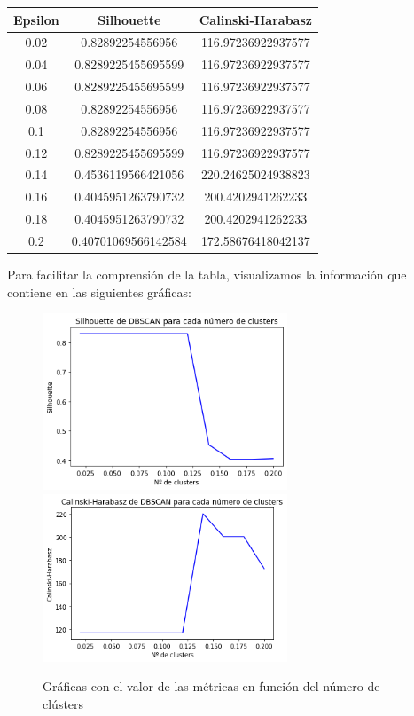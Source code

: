 \documentclass[a4]{article}
\begin{document}
\begin{center}
\begin{tabular}{|c|c|c|}
\hline
\multicolumn{1}{|c|}{\textbf{Epsilon}}& \textbf{Silhouette} & \textbf{Calinski-Harabasz}\\ \hline
  0.02  & 0.82892254556956    & 116.97236922937577  \\ \hline
  0.04  & 0.8289225455695599  & 116.97236922937577  \\ \hline
  0.06  & 0.8289225455695599  & 116.97236922937577  \\ \hline
  0.08  & 0.82892254556956    & 116.97236922937577  \\ \hline
  0.1   & 0.82892254556956    & 116.97236922937577  \\ \hline
  0.12  & 0.8289225455695599  & 116.97236922937577  \\ \hline
  0.14  & 0.4536119566421056  & 220.24625024938823  \\ \hline
  0.16  & 0.4045951263790732  & 200.4202941262233   \\ \hline
  0.18  & 0.4045951263790732  & 200.4202941262233   \\ \hline
  0.2   & 0.40701069566142584 & 172.58676418042137  \\ \hline
\end{tabular}
\end{center}

Para facilitar la comprensión de la tabla, visualizamos la información que contiene en las siguientes gráficas:

\begin{figure}[H]
  \centering
  \caption{Gráficas con el valor de las métricas en función del número de clústers}
  \includegraphics[width=73mm]{imagenes/c2_dbscan_sil}
  \includegraphics[width=73mm]{imagenes/c2_dbscan_cal}
\end{figure}
\end{document}
